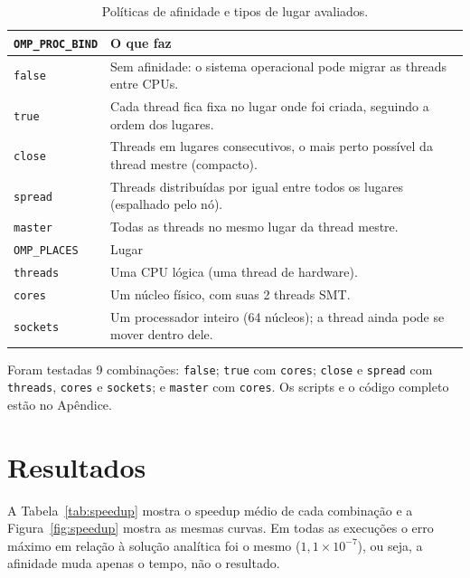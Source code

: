 \documentclass[a4paper,12pt]{article}
\begin{document}
\begin{table}[ht]
\centering
\small
\begin{tabular}{@{}p{3.1cm}p{12.4cm}@{}}
\toprule
\texttt{OMP\_PROC\_BIND} & O que faz \\
\midrule
\texttt{false} & Sem afinidade: o sistema operacional pode migrar as threads entre CPUs. \\
\texttt{true} & Cada thread fica fixa no lugar onde foi criada, seguindo a ordem dos lugares. \\
\texttt{close} & Threads em lugares consecutivos, o mais perto possível da thread mestre (compacto). \\
\texttt{spread} & Threads distribuídas por igual entre todos os lugares (espalhado pelo nó). \\
\texttt{master} & Todas as threads no mesmo lugar da thread mestre. \\
\midrule
\texttt{OMP\_PLACES} & Lugar \\
\midrule
\texttt{threads} & Uma CPU lógica (uma thread de hardware). \\
\texttt{cores} & Um núcleo físico, com suas 2 threads SMT. \\
\texttt{sockets} & Um processador inteiro (64 núcleos); a thread ainda pode se mover dentro dele. \\
\bottomrule
\end{tabular}
\caption{Políticas de afinidade e tipos de lugar avaliados.}
\label{tab:afin}
\end{table}

Foram testadas 9 combinações: \texttt{false}; \texttt{true} com \texttt{cores}; \texttt{close} e \texttt{spread} com \texttt{threads}, \texttt{cores} e \texttt{sockets}; e \texttt{master} com \texttt{cores}. Os scripts e o código completo estão no Apêndice.

\section{Resultados}

A Tabela~\ref{tab:speedup} mostra o speedup médio de cada combinação e a Figura~\ref{fig:speedup} mostra as mesmas curvas. Em todas as execuções o erro máximo em relação à solução analítica foi o mesmo ($1{,}1\times10^{-7}$), ou seja, a afinidade muda apenas o tempo, não o resultado.

\begin{table}[H]
\centering
\small
\setlength{\tabcolsep}{4.5pt}

\caption{Speedup médio (5 repetições) por número de threads.}
\label{tab:speedup}
\end{table}
\end{document}
